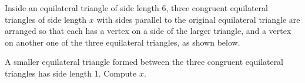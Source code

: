 Inside an equilateral triangle of side length $6$, three congruent equilateral triangles of side length $x$ with sides parallel to the original equilateral triangle are arranged so that each has a vertex on a side of the larger triangle, and a vertex on another one of the three equilateral triangles, as shown below.


A smaller equilateral triangle formed between the three congruent equilateral triangles has side length 1. Compute $x$.
